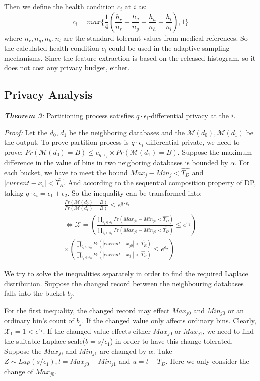 \documentclass[10pt,conference]{IEEEtran}
\begin{document}
Then we define the health condition $c_i$ at  $i$ as:
\begin{equation}\label{health}
c_i= max\{\frac{1}{4}(\frac{h_r}{n_r}+\frac{h_g}{n_g}+\frac{h_h}{n_h}+\frac{h_l}{n_l}),1\}
\end{equation}
where $n_r,n_g,n_h,n_l$ are the standard tolerant values from medical references. So the calculated health condition $c_i$ could be used in the adaptive sampling mechanisms. Since the feature extraction is based on the released histogram, so it does not cost any privacy budget, either.


\subsection{Privacy Analysis}

\emph{\textbf{Theorem 3}:} Partitioning process satisfies $q\cdot \epsilon_i$-differential privacy at the  $i$.

\emph{Proof:} Let the $d_0$, $d_1$ be the neighboring databases and the $\mathcal{M}(d_0),\mathcal{M}(d_1)$ be the output. To prove partition process is $q\cdot \epsilon_i$-differential private, we need to prove: $Pr(\mathcal{M}(d_0)=B)\leq e_{q\cdot \epsilon_i} \times Pr(\mathcal{M}(d_1)=B)$. Suppose the maximum difference in the value of bins in two neigboring databases is bounded by $\alpha$. For each bucket, we have to meet the bound $Max_j-Min_j<\hat{T_D}$ and $|current-x_i|<\hat{T_R}$. And according to the sequential composition property of DP, taking $q\cdot \epsilon_i=\epsilon_1+\epsilon_2$. So the inequality can be transformed into: 
\begin{multline*}
\frac{Pr(\mathcal{M}(d_0)=B)}{Pr(\mathcal{M}(d_1)=B)}\leq e^{q\cdot \epsilon_i}\\
\Leftrightarrow \mathcal{X}=(\frac{\prod\limits_{b_i\in d_0}Pr(Max_{j0}-Min_{j0}<\hat{T_D})}{\prod\limits_{b_i\in d_0}Pr(Max_{j0}-Min_{j0}<\hat{T_D})}\leq e^{\epsilon_1})\\
\times( \frac{\prod\limits_{b_i\in d_0}Pr(|current-x_{j0}|<\hat{T_R})}{\prod\limits_{b_i\in d_0}Pr(|current-x_{j1}|<\hat{T_R})}\leq e^{\epsilon_2})
\end{multline*} 

We try to solve the inequalities separately in order to find the required Laplace distribution. Suppose the changed record between the neighbouring databases falls into the bucket $b_j$. 

For the first inequality, the changed record may effect $Max_{j0}$ and $Min_{j0}$ or an ordinary bin's count of $b_j$. If the changed value only affects ordinary bins. Clearly, $\mathcal{X}_1=1<e^{\epsilon_1}$. If the changed value effects either $Max_{j0}$ or $Max_{j1}$, we need to find the suitable Laplace scale($b=s/\epsilon_1$) in order to have this change tolerated. Suppose the $Max_{j0}$ and $Min_{j1}$ are changed by $\alpha$. Take $Z\sim Lap(s/\epsilon_1),t=Max_{j0}-Min_{j1}$ and $u=t-T_D$. Here we only consider the change of $Max_{j0}$.
\end{document}
